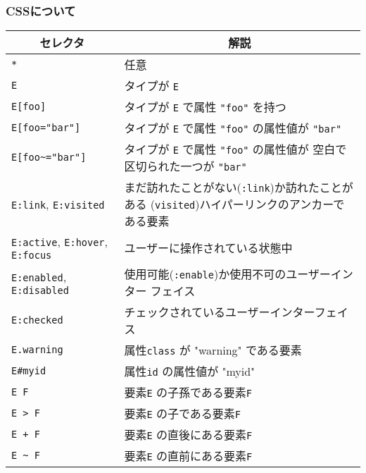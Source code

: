 \begin{frame}[containsverbatim]
 \frametitle{CSSについて}
 {\footnotesize
\begin{tabular}{|m{13em}|m{}|}\hline
\multicolumn{1}{|c|}{セレクタ}&\multicolumn{1}{c|}{解説}\\\hline
\Verb+*+&任意%
\\\hline
\Verb+E+&タイプが \Verb+E+ %
\\\hline
\Verb+E[foo]+&タイプが \Verb+E+ で属性 \Verb+"foo"+ を持つ%
\\\hline
\Verb+E[foo="bar"]+&タイプが \Verb+E+ で属性 \Verb+"foo"+ の属性値が
     \Verb+"bar"+%
\\\hline
\Verb+E[foo~="bar"]+&タイプが \Verb+E+ で属性 \Verb+"foo"+ の属性値が
     空白で区切られた一つが \Verb+"bar"+%
 \\\hline
\Verb+E:link+, %
\Verb+E:visited+&まだ訪れたことがない(\texttt{:link})か訪れたことがある
     (\texttt{visited})ハイパーリンクのアンカーである要素%
\\\hline
\Verb+E:active+, %
\Verb+E:hover+, %
\Verb+E:focus+&ユーザーに操作されている状態中%
\\\hline
\Verb+E:enabled+, %
\Verb+E:disabled+&使用可能(\texttt{:enable})か使用不可のユーザーインター
     フェイス%
\\\hline
\Verb+E:checked+&チェックされているユーザーインターフェイス%
\\\hline
\Verb+E.warning+&属性\texttt{class} が "warning" である要素%
\\\hline
\Verb+E#myid+&属性\texttt{id} の属性値が "myid" %
\\\hline
\Verb+E F+&要素\texttt{E} の子孫である要素\texttt{F}%
\\\hline
\Verb+E > F+&要素\texttt{E} の子である要素\texttt{F}%
\\\hline
\Verb-E + F-&要素\texttt{E} の直後にある要素\texttt{F}%
\\\hline
\Verb+E ~ F+&要素\texttt{E} の直前にある要素\texttt{F}%
\\\hline
\end{tabular}
 }
\end{frame}
